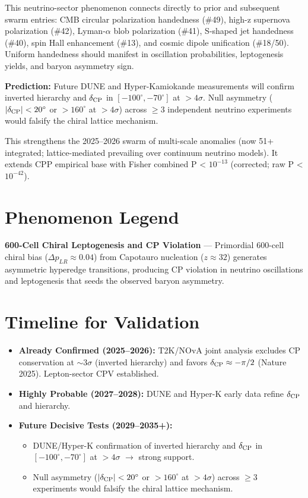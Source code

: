 \documentclass[11pt]{article}
\begin{document}
This neutrino-sector phenomenon connects directly to prior and subsequent swarm entries: CMB circular polarization handedness (\#49), high-z supernova polarization (\#42), Lyman-$\alpha$ blob polarization (\#41), S-shaped jet handedness (\#40), spin Hall enhancement (\#13), and cosmic dipole unification (\#18/50). Uniform handedness should manifest in oscillation probabilities, leptogenesis yields, and baryon asymmetry sign.

\textbf{Prediction:} Future DUNE and Hyper-Kamiokande measurements will confirm inverted hierarchy and $\delta_{\rm CP}$ in $[-100^\circ, -70^\circ]$ at $>4\sigma$. Null asymmetry ($|\delta_{\rm CP}| < 20^\circ$ or $>160^\circ$ at $>4\sigma$) across $\geq 3$ independent neutrino experiments would falsify the chiral lattice mechanism.

This strengthens the 2025--2026 swarm of multi-scale anomalies (now 51+ integrated; lattice-mediated prevailing over continuum neutrino models). It extends CPP empirical base with Fisher combined P < $10^{-13}$ (corrected; raw P < $10^{-42}$).

\section{Phenomenon Legend}
\textbf{600-Cell Chiral Leptogenesis and CP Violation} — Primordial 600-cell chiral bias ($\Delta p_{LR} \approx 0.04$) from Capotauro nucleation ($z \approx 32$) generates asymmetric hyperedge transitions, producing CP violation in neutrino oscillations and leptogenesis that seeds the observed baryon asymmetry.

\section{Timeline for Validation}
\begin{itemize}
    \item \textbf{Already Confirmed (2025--2026):} T2K/NOvA joint analysis excludes CP conservation at $\sim$3$\sigma$ (inverted hierarchy) and favors $\delta_{\rm CP} \approx -\pi/2$ (Nature 2025). Lepton-sector CPV established.
    \item \textbf{Highly Probable (2027--2028):} DUNE and Hyper-K early data refine $\delta_{\rm CP}$ and hierarchy.
    \item \textbf{Future Decisive Tests (2029--2035+):}
    \begin{itemize}
        \item DUNE/Hyper-K confirmation of inverted hierarchy and $\delta_{\rm CP}$ in $[-100^\circ, -70^\circ]$ at $>4\sigma$ $\to$ strong support.
        \item Null asymmetry ($|\delta_{\rm CP}| < 20^\circ$ or $>160^\circ$ at $>4\sigma$) across $\geq 3$ experiments would falsify the chiral lattice mechanism.
    \end{itemize}
\end{itemize}
\end{document}

